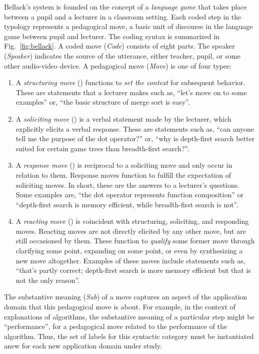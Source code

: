 \documentclass[conference]{IEEEtran}
\begin{document}
Bellack's system is founded on the concept of a \emph{language game} that takes
place between a pupil and a lecturer in a classroom setting.
%
Each coded step in the typology represents a pedagogical move, a basic unit of
discourse in the language game between pupil and lecturer.
%
The coding syntax is summarized in Fig.~\ref{fig:bellack}.
%
A coded move (\emph{Code}) consists of eight parts. The speaker
(\emph{Speaker}) indicates the source of the utterance, either teacher, pupil,
or some other audio-video device.
%
A pedagogical move (\emph{Move}) is one of four types:
%
\begin{enumerate}

\item A \emph{structuring move} () functions to \emph{set the
context} for subsequent behavior. These are statements that a lecturer makes
such as, ``let's move on to some examples'' or, ``the basic structure of merge
sort is easy''.

\item A \emph{soliciting move} () is a verbal statement made by the
lecturer, which explicitly elicits a verbal response. These are statements such
as, ``can anyone tell me the purpose of the dot operator?'' or, ``why is
depth-first search better suited for certain game trees than breadth-first
search?''.

\item A \emph{response move} () is reciprocal to a soliciting move
and only occur in relation to them. Response moves function to fulfill the
expectation of soliciting moves. In short, these are the answers to a
lecturer's questions. Some examples are, ``the dot operator represents function
composition'' or ``depth-first search is memory efficient, while breadth-first
search is not''.

\item A \emph{reacting move} () is coincident with structuring,
soliciting, and responding moves. Reacting moves are not directly elicited by
any other move, but are still occasioned by them. These function to
\emph{qualify} some former move through clarifying some point, expanding on
some point, or even by synthesizing a new move altogether. Examples of these
moves include statements such as, ``that's partly correct; depth-first search
is more memory efficient but that is not the only reason''.

\end{enumerate}

\noindent
%
The substantive meaning (\emph{Sub}) of a move captures an aspect of the
application domain that this pedagogical move is about. For example, in the
context of explanations of algorithms, the substantive meaning of a particular
step might be ``performance'', for a pedagogical move related to the
performance of the algorithm. Thus, the set of labels for this syntactic
category must be instantiated anew for each new application domain under study.
\end{document}
